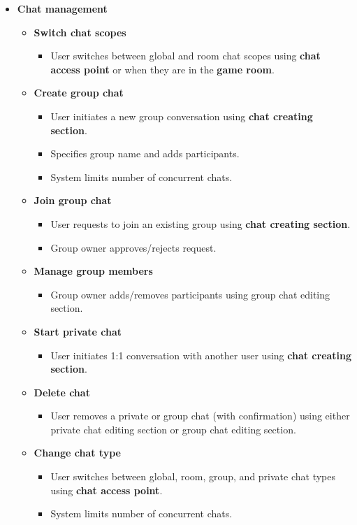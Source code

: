 \documentclass[]{VUMIFTemplateClass}
\begin{document}
\begin{itemize}
    \item \textbf{Chat management}
    \begin{itemize}
        \item \textbf{Switch chat scopes}
        \begin{itemize}
            \item User switches between global and room chat scopes using \textbf{chat access point} or when they are in the \textbf{game room}.
        \end{itemize}
        \item \textbf{Create group chat}
        \begin{itemize}
            \item User initiates a new group conversation using \textbf{chat creating section}.
            \item Specifies group name and adds participants.
            \item System limits number of concurrent chats.
        \end{itemize}
        \item \textbf{Join group chat}
        \begin{itemize}
            \item User requests to join an existing group using \textbf{chat creating section}.
            \item Group owner approves/rejects request.
        \end{itemize}
        \item \textbf{Manage group members}
        \begin{itemize}
            \item Group owner adds/removes participants using group chat editing section.
        \end{itemize}
        \item \textbf{Start private chat}
        \begin{itemize}
            \item User initiates 1:1 conversation with another user using \textbf{chat creating section}.
        \end{itemize}
        \item \textbf{Delete chat}
        \begin{itemize}
            \item User removes a private or group chat (with confirmation) using either private chat editing section or group chat editing section.
        \end{itemize}
        \item \textbf{Change chat type}
        \begin{itemize}
            \item User switches between global, room, group, and private chat types using \textbf{chat access point}.
            \item System limits number of concurrent chats.
        \end{itemize}
    \end{itemize}


\end{itemize}
\end{document}
